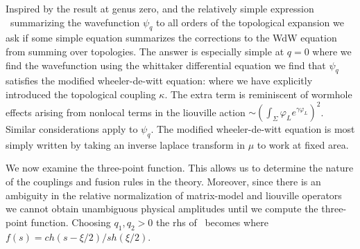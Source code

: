 Inspired by the result at genus zero, and the relatively simple 
expression \anint\ summarizing the wavefunction $\psi_q$ to 
all orders of the topological expansion we ask if some 
simple equation summarizes the corrections to the WdW equation 
from summing over topologies. The answer is especially simple
at $q=0$ where we find the wavefunction
\eqn{}
using the whittaker differential equation we find that 
$\psi_q$ satisfies the modified wheeler-de-witt equation:
\eqn{}
where we have explicitly introduced the topological coupling
$\kappa$. The extra term is reminiscent of wormhole effects 
arising from nonlocal terms in the liouville action 
$\sim (\int_{\Sigma} \varphi_L e^{\gamma\varphi_L})^2$. 
Similar considerations apply to $\psi_q$. The modified
wheeler-de-witt equation is most simply written by 
taking an inverse laplace transform in $\mu$ to work 
at fixed area.


We now examine the three-point function. This allows us to 
determine the nature of the couplings and fusion rules in 
the theory. Moreover, since there is an ambiguity in 
the relative normalization of matrix-model and liouville 
operators we cannot obtain unambiguous physical amplitudes
until we compute the three-point function.
Choosing $q_1,q_2>0$ the rhs of \macptii\ becomes
\eqn{}
where $f(s)=ch(s-\xi/2)/sh(\xi/2)$. 


